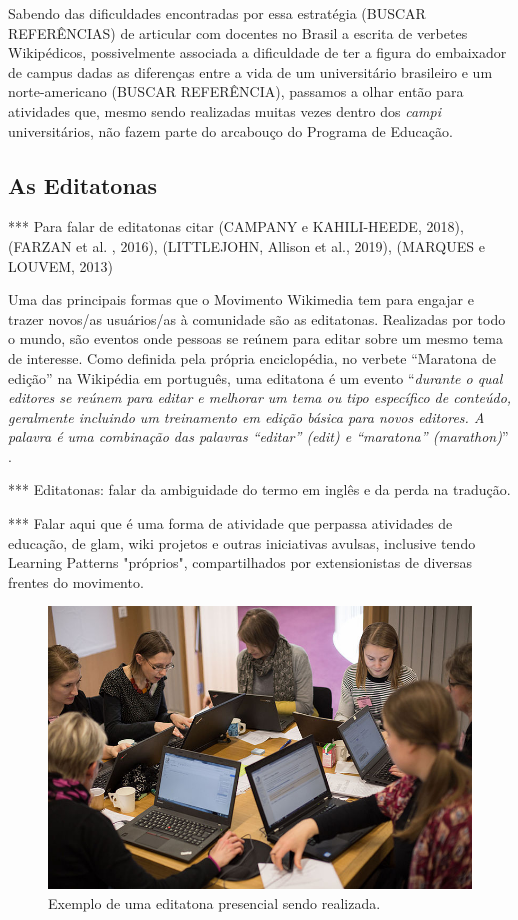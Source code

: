 Sabendo das dificuldades encontradas por essa estratégia (BUSCAR REFERÊNCIAS) de articular com docentes no Brasil a escrita de verbetes Wikipédicos, possivelmente associada a dificuldade de ter a figura do embaixador de campus dadas as diferenças entre a vida de um universitário brasileiro e um norte-americano (BUSCAR REFERÊNCIA), passamos a olhar então para atividades que, mesmo sendo realizadas muitas vezes dentro dos \textit{campi} universitários, não fazem parte do arcabouço do Programa de Educação.

\subsection{As Editatonas}

*** Para falar de editatonas citar (CAMPANY e KAHILI-HEEDE, 2018), (FARZAN et al. , 2016), (LITTLEJOHN, Allison et al., 2019), (MARQUES e LOUVEM, 2013)

Uma das principais formas que o Movimento Wikimedia tem para engajar e trazer novos/as usuários/as à comunidade são as editatonas. Realizadas por todo o mundo, são eventos onde pessoas se reúnem para editar sobre um mesmo tema de interesse. Como definida pela própria enciclopédia, no verbete ``Maratona de edição'' na Wikipédia em português, uma editatona é um evento ``\textit{durante o qual editores se reúnem para editar e melhorar um tema ou tipo específico de conteúdo, geralmente incluindo um treinamento em edição básica para novos editores. A palavra é uma combinação das palavras ``editar'' (\textit{edit}) e ``maratona'' (\textit{marathon})}'' .

*** Editatonas: falar da ambiguidade do termo em inglês e da perda na tradução.

*** Falar aqui que é uma forma de atividade que perpassa atividades de educação, de glam, wiki projetos e outras iniciativas avulsas, inclusive tendo Learning Patterns "próprios", compartilhados por extensionistas de diversas frentes do movimento.

\begin{figure}[H]
    \centering
    \includegraphics[width=1\textwidth]{Images/editatona_antiga.jpg}
    \caption{Exemplo de uma editatona presencial sendo realizada.}
    \label{fig:editatona_antiga}
\end{figure}

